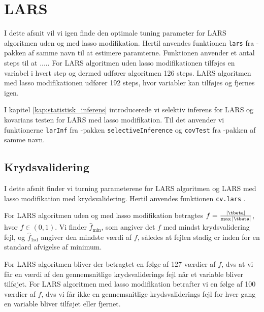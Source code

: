 \section{LARS}
I dette afsnit vil vi igen finde den optimale tuning parameter for LARS algoritmen uden og med lasso modifikation. Hertil anvendes funktionen \texttt{lars} fra  \Rlang-pakken af samme navn til at estimere paramterne. 
Funktionen anvender et antal steps til at ..... 
For LARS algoritmen uden lasso modifikationen tilføjes en variabel i hvert step og dermed udfører algoritmen 126 steps.
LARS algoritmen med lasso modifikationen udfører 192 steps, hvor variabler kan tilføjes og fjernes igen.

I kapitel \ref{kap:statistisk_inferens} introducerede vi selektiv inferens for LARS og kovarians testen for LARS med lasso modifikation.   
Til det anvender vi funktionerne \texttt{larInf} fra \Rlang-pakken  \texttt{selectiveInference} og \texttt{covTest} fra \Rlang-pakken af samme navn. 

\subsection{Krydsvalidering}
I dette afsnit finder vi turning parameterene for LARS algoritmen og LARS med lasso modifikation med krydsvalidering. 
Hertil anvendes funktionen \texttt{cv.lars} . 
 
For LARS algoritmen uden og med lasso modifikation betragtes $f = \frac{\vert \tbeta \vert}{\max \vert \tbeta \vert}$, hvor $f \in (0,1)$. 
Vi finder \(\widehat{f}_{\min}\), som angiver det $f$ med mindst krydsvalidering fejl, og  \(\widehat{f}_{\text{1sd}}\) angiver den mindste værdi af $f$, således at fejlen stadig er inden for en standard afvigelse af minimum. 

For LARS algoritmen bliver der betragtet en følge af 127 værdier af $f$, dvs at vi får en værdi af den gennemsnitlige krydsvaliderings fejl når et variable bliver tilføjet.
For LARS algoritmen med lasso modifikation  betrafter vi en følge af 100 værdier af $f$, dvs vi får ikke en gennemsnitlige krydsvaliderings fejl for hver gang en variable bliver tilføjet eller fjernet. 


%
%

